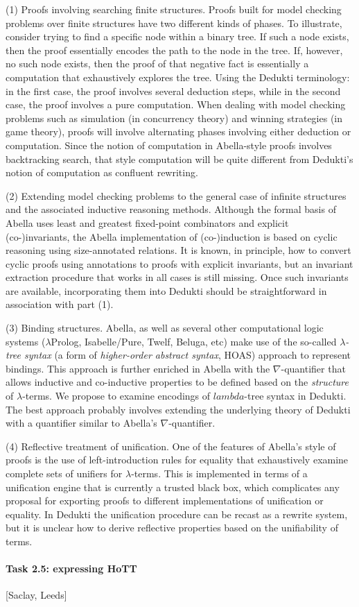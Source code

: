 (1) Proofs involving searching finite structures. Proofs built for
model checking problems over finite structures have two different
kinds of phases.  To illustrate, consider trying to find a specific
node within a binary tree.  If such a node exists, then the proof
essentially encodes the path to the node in the tree.  If, however, no
such node exists, then the proof of that negative fact is essentially
a computation that exhaustively explores the tree.  Using the Dedukti
terminology: in the first case, the proof involves several deduction
steps, while in the second case, the proof involves a pure
computation. When dealing with model checking problems such as
simulation (in concurrency theory) and winning strategies (in game
theory), proofs will involve alternating phases involving either
deduction or computation.  Since the notion of computation in
Abella-style proofs involves backtracking search, that style
computation will be quite different from Dedukti's notion of
computation as confluent rewriting.

(2) Extending model checking problems to the general case of infinite
structures and the associated inductive reasoning methods. Although
the formal basis of Abella uses least and greatest fixed-point
combinators and explicit (co-)invariants, the Abella implementation of
(co-)induction is based on cyclic reasoning using size-annotated
relations. It is known, in principle, how to convert cyclic proofs
using annotations to proofs with explicit invariants, but an invariant
extraction procedure that works in all cases is still missing. Once
such invariants are available, incorporating them into Dedukti should
be straightforward in association with part (1).

(3) Binding structures. Abella, as well as several other computational
logic systems ($\lambda$Prolog, Isabelle/Pure, Twelf, Beluga, etc)
make use of the so-called \emph{$\lambda$-tree syntax} (a form of
\emph{higher-order abstract syntax}, HOAS) approach to represent
bindings. This approach is further enriched in Abella with the
$\nabla$-quantifier that allows inductive and co-inductive properties
to be defined based on the \emph{structure} of $\lambda$-terms. We
propose to examine encodings of $lambda$-tree syntax in Dedukti. The
best approach probably involves extending the underlying theory of
Dedukti with a quantifier similar to Abella's $\nabla$-quantifier.

(4) Reflective treatment of unification. One of the features of
Abella's style of proofs is the use of left-introduction rules for
equality that exhaustively examine complete sets of unifiers for
$\lambda$-terms. This is implemented in terms of a unification engine
that is currently a trusted black box, which complicates any proposal
for exporting proofs to different implementations of unification or
equality. In Dedukti the unification procedure can be recast as a
rewrite system, but it is unclear how to derive reflective properties
based on the unifiability of terms.

\paragraph{Task 2.5: expressing HoTT}

[Saclay, Leeds]
